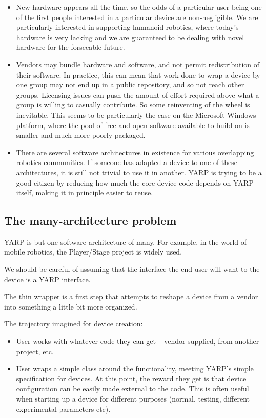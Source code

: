 \begin{itemize}

\item New hardware appears all the time, so the odds of a particular
user being one of the first people interested in a particular device are
non-negligible.  We are particularly interested in supporting humanoid
robotics, where today's hardware is very lacking and we are guaranteed
to be dealing with novel hardware for the forseeable future.

\item Vendors may bundle hardware and software, and not permit
redistribution of their software.  In practice, this can mean that
work done to wrap a device by one group may not end up in a public
repository, and so not reach other groups.  Licensing issues can push
the amount of effort required above what a group is willing to
casually contribute.  So some reinventing of the wheel is inevitable.
This seems to be particularly the case on the Microsoft Windows
platform, where the pool of free and open software available to build
on is smaller and much more poorly packaged.

\item There are several software architectures in existence for
various overlapping robotics communities.  If someone has adapted
a device to one of these architectures, it is still not trivial
to use it in another.  YARP is trying to be a good citizen by
reducing how much the core device code depends on YARP itself,
making it in principle easier to reuse.


\end{itemize}



\subsection{The many-architecture problem}

YARP is but one software architecture of many.  For example, in the
world of mobile robotics, the Player/Stage project is widely used.

We should be careful of assuming that the interface the end-user will
want to the device is a YARP interface.

The thin wrapper is a first step that attempts to reshape a
device from a vendor into something a little bit more organized.

The trajectory imagined for device creation:

\begin{itemize}

\item User works with whatever code they can get -- vendor
supplied, from another project, etc.

\item User wraps a simple class around the functionality,
meeting YARP's simple specification for devices.  At this
point, the reward they get is that device configuration
can be easily made external to the code.  This is often
useful when starting up a device for different purposes
(normal, testing, different experimental parameters etc).

\end{itemize}


